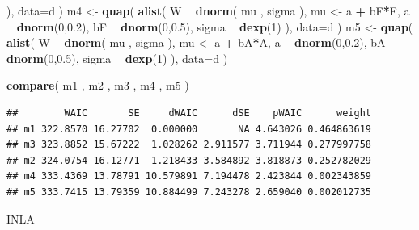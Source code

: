 \documentclass[
]{article}
\newenvironment{Shaded}{\begin{snugshade}}{\end{snugshade}}
\newcommand{\DataTypeTok}[1]{\textcolor[rgb]{0.13,0.29,0.53}{#1}}
\newcommand{\DecValTok}[1]{\textcolor[rgb]{0.00,0.00,0.81}{#1}}
\newcommand{\FloatTok}[1]{\textcolor[rgb]{0.00,0.00,0.81}{#1}}
\newcommand{\KeywordTok}[1]{\textcolor[rgb]{0.13,0.29,0.53}{\textbf{#1}}}
\newcommand{\NormalTok}[1]{#1}
\newcommand{\OperatorTok}[1]{\textcolor[rgb]{0.81,0.36,0.00}{\textbf{#1}}}
\newcommand{\StringTok}[1]{\textcolor[rgb]{0.31,0.60,0.02}{#1}}
\begin{document}
\begin{Shaded}
\begin{Highlighting}[]
\NormalTok{    ), }\DataTypeTok{data=}\NormalTok{d )}
\NormalTok{m4 <-}\StringTok{ }\KeywordTok{quap}\NormalTok{(}
    \KeywordTok{alist}\NormalTok{(}
\NormalTok{        W }\OperatorTok{~}\StringTok{ }\KeywordTok{dnorm}\NormalTok{( mu , sigma ),}
\NormalTok{        mu <-}\StringTok{ }\NormalTok{a }\OperatorTok{+}\StringTok{ }\NormalTok{bF}\OperatorTok{*}\NormalTok{F,}
\NormalTok{        a }\OperatorTok{~}\StringTok{ }\KeywordTok{dnorm}\NormalTok{(}\DecValTok{0}\NormalTok{,}\FloatTok{0.2}\NormalTok{),}
\NormalTok{        bF }\OperatorTok{~}\StringTok{ }\KeywordTok{dnorm}\NormalTok{(}\DecValTok{0}\NormalTok{,}\FloatTok{0.5}\NormalTok{),}
\NormalTok{        sigma }\OperatorTok{~}\StringTok{ }\KeywordTok{dexp}\NormalTok{(}\DecValTok{1}\NormalTok{)}
\NormalTok{    ), }\DataTypeTok{data=}\NormalTok{d )}
\NormalTok{m5 <-}\StringTok{ }\KeywordTok{quap}\NormalTok{(}
    \KeywordTok{alist}\NormalTok{(}
\NormalTok{        W }\OperatorTok{~}\StringTok{ }\KeywordTok{dnorm}\NormalTok{( mu , sigma ),}
\NormalTok{        mu <-}\StringTok{ }\NormalTok{a }\OperatorTok{+}\StringTok{ }\NormalTok{bA}\OperatorTok{*}\NormalTok{A,}
\NormalTok{        a }\OperatorTok{~}\StringTok{ }\KeywordTok{dnorm}\NormalTok{(}\DecValTok{0}\NormalTok{,}\FloatTok{0.2}\NormalTok{),}
\NormalTok{        bA }\OperatorTok{~}\StringTok{ }\KeywordTok{dnorm}\NormalTok{(}\DecValTok{0}\NormalTok{,}\FloatTok{0.5}\NormalTok{),}
\NormalTok{        sigma }\OperatorTok{~}\StringTok{ }\KeywordTok{dexp}\NormalTok{(}\DecValTok{1}\NormalTok{)}
\NormalTok{), }\DataTypeTok{data=}\NormalTok{d )}


 \KeywordTok{compare}\NormalTok{( m1 , m2 , m3 , m4 , m5 )}
\end{Highlighting}
\end{Shaded}

\begin{verbatim}
##        WAIC       SE     dWAIC      dSE    pWAIC      weight
## m1 322.8570 16.27702  0.000000       NA 4.643026 0.464863619
## m3 323.8852 15.67222  1.028262 2.911577 3.711944 0.277997758
## m2 324.0754 16.12771  1.218433 3.584892 3.818873 0.252782029
## m4 333.4369 13.78791 10.579891 7.194478 2.423844 0.002343859
## m5 333.7415 13.79359 10.884499 7.243278 2.659040 0.002012735
\end{verbatim}

INLA
\end{document}
